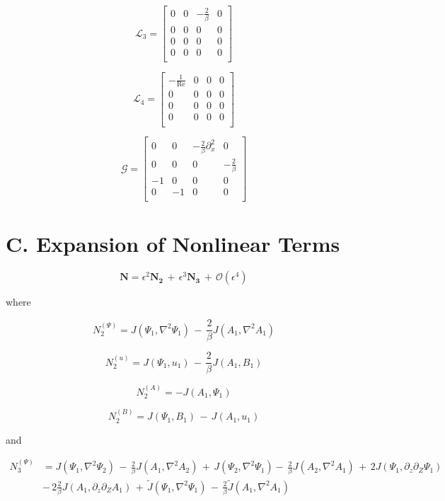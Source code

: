 \documentclass{emulateapj}
\newcommand{\beq}{\begin{equation}}
\newcommand{\eeq}{\end{equation}}
\newcommand\reye{\mathrm{Re}}
\begin{document}
\beq
\mathcal{L}_3 = \left[\begin{matrix}
0 & 0 & -\frac{2}{\beta} & 0 \\
0 & 0 & 0 & 0 \\
0 & 0 & 0 & 0 \\
0 & 0 & 0 & 0 \\ \end{matrix} \right]
\eeq

\beq
\mathcal{L}_4 = \left[\begin{matrix}
-\frac{1}{\reye} & 0 & 0 & 0 \\
0 & 0 & 0 & 0 \\
0 & 0 & 0 & 0 \\
0 & 0 & 0 & 0 \\ \end{matrix}\right] 
\eeq

\beq
\mathcal{G} = \left[\begin{matrix}
0 & 0 & -\frac{2}{\beta}\partial_x^2 & 0 \\
0 & 0 & 0 & -\frac{2}{\beta} \\
-1 & 0 & 0 & 0 \\
0 & -1 & 0 & 0 \\ \end{matrix} \right]
\eeq



\section{C. Expansion of Nonlinear Terms}\label{app:nonlinear_terms}
\beq
\mathbf{N} = \epsilon^2\mathbf{N_2} \, + \, \epsilon^3\mathbf{N_3} \, + \, \mathcal{O}(\epsilon^4)
\eeq

where

\beq
N_2^{(\Psi)} = J(\Psi_1, \nabla^2 \Psi_1) \,-\, \frac{2}{\beta}J(A_1, \nabla^2 A_1) 
\eeq

\beq
N_2^{(u)} = J(\Psi_1, u_1) \, - \, \frac{2}{\beta} J(A_1, B_1) 
\eeq

\beq
N_2^{(A)} = - J(A_1, \Psi_1) 
\eeq

\beq
N_2^{(B)} =  J(\Psi_1, B_1) \, - \, J(A_1, u_1)
\eeq

and

\beq
\begin{split}
N_3^{(\Psi)} & = J(\Psi_1, \nabla^2\Psi_2) \, - \, \frac{2}{\beta}J(A_1, \nabla^2 A_2) \,+\, J(\Psi_2, \nabla^2\Psi_1) - \, \frac{2}{\beta}J(A_2, \nabla^2 A_1) \,+\, 2 J(\Psi_1, \partial_z\partial_Z \Psi_1) \, \\
& - \, 2 \frac{2}{\beta}J(A_1, \partial_z\partial_Z A_1) \,+\, \widetilde{J}(\Psi_1, \nabla^2 \Psi_1) \, - \,  \frac{2}{\beta}\widetilde{J}(A_1, \nabla^2 A_1)\\
\end{split}
\eeq
\end{document}
